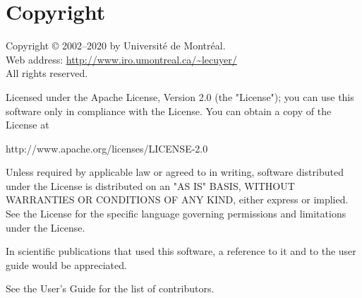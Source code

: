  \section*{Copyright}
 

Copyright \copyright {} 2002--2020 by Universit\'e de Montr\'eal.\\
  Web address:   \url{http://www.iro.umontreal.ca/~lecuyer/} \\
  All rights reserved.

Licensed under the Apache License, Version 2.0 (the "License"); 
you can use this software only in compliance with the License. 
You can obtain a copy of the License at

http://www.apache.org/licenses/LICENSE-2.0

Unless required by applicable law or agreed to in writing, software distributed under the License is distributed on an "AS IS" BASIS, WITHOUT WARRANTIES OR CONDITIONS OF ANY KIND, either express or implied. See the License for the specific language governing permissions and limitations under the License.

In scientific publications that used this software, a reference to it and to the user guide would be appreciated.

See the User's Guide for the list of contributors.
